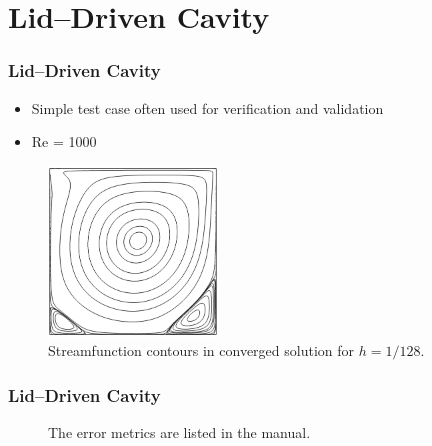 \section{Lid--Driven Cavity}

\begin{frame}
    \frametitle{Lid--Driven Cavity}
\begin{itemize}
\item Simple test case often used for verification and validation
\item Re = 1000
\end{itemize}
\begin{figure}
\centering
\includegraphics[width=0.4\textwidth]{./driven_cavity/driven_cavity_streamfunction.png}
\caption{Streamfunction contours in converged solution for $h=1/128$.}
\end{figure}
\end{frame}

\begin{frame}
    \frametitle{Lid--Driven Cavity}
\begin{figure}
\centering
{}
\hspace{10mm}
\caption{The error metrics are listed in the manual.}
\end{figure}
\end{frame}




